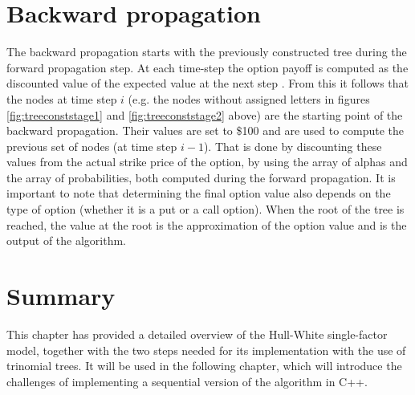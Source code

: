 \section{Backward propagation}
The backward propagation starts with the previously constructed tree during the forward propagation step. At each time-step the option payoff is computed as the discounted value of the expected value at the next step \cite[pg. 6]{uhwirt}. From this it follows that the nodes at time step $i$ (e.g. the nodes without assigned letters in figures \ref{fig:treeconststage1} and \ref{fig:treeconststage2} above) are the starting point of the backward propagation. Their values are set to \$100 and are used to compute the previous set of nodes (at time step $i-1$). That is done by discounting these values from the actual strike price of the option, by using the array of alphas and the array of probabilities, both computed during the forward propagation. It is important to note that determining the final option value also depends on the type of option (whether it is a put or a call option). When the root of the tree is reached, the value at the root is the approximation of the option value and is the output of the algorithm. 

\section*{Summary}
This chapter has provided a detailed overview of the Hull-White single-factor model, together with the two steps needed for its implementation with the use of trinomial trees. It will be used in the following chapter, which will introduce the challenges of implementing a sequential version of the algorithm in C++.


